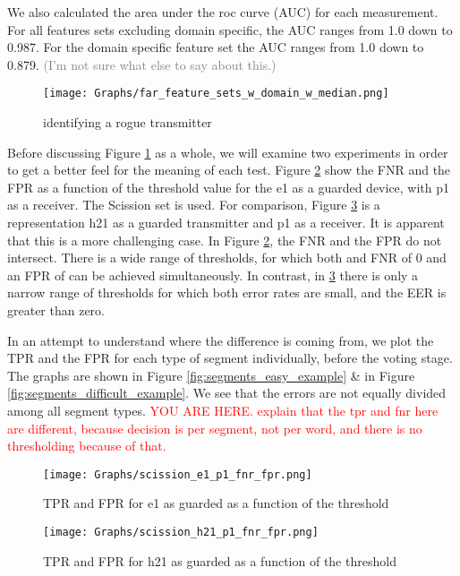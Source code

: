 \documentclass[conference]{IEEEtran}
\begin{document}
  We also calculated the area under the roc curve (AUC) for each measurement. For all features sets excluding domain specific, the AUC ranges from 1.0 down to 0.987. For the domain specific feature set the AUC ranges from 1.0 down to 0.879. \textcolor{gray}{(I'm not sure what else to say about this.)}
  
  \begin{figure}[t]
    \centering
    \texttt{[image: Graphs/far\_feature\_sets\_w\_domain\_w\_median.png]}
    \caption{identifying a rogue transmitter}
    \label{fig:rogue_transmitter_results}
  \end{figure}
  
  Before discussing Figure \ref{fig:rogue_transmitter_results} as a whole, we will examine two experiments in order to get a better feel for the meaning of each test. Figure \ref{fig:detection_easy_example} show the FNR and the FPR as a function of the threshold value for the e1 as a guarded device, with p1 as a receiver. The Scission set is used. For comparison, Figure \ref{fig:detection_difficult_example} is a representation h21 as a guarded transmitter and p1 as a receiver. It is apparent that this is a more challenging case. In Figure \ref{fig:detection_easy_example}, the FNR and the FPR do not intersect. There is a wide range of thresholds, for which both and FNR of 0 and an FPR of can be achieved simultaneously. In contrast, in \ref{fig:detection_difficult_example} there is only a narrow range of thresholds for which both error rates are small, and the EER is greater than zero.
  
  In an attempt to understand where the difference is coming from, we plot the TPR and the FPR for each type of segment individually, before the voting stage. The graphs are shown in Figure \ref{fig:segments_easy_example} \& in Figure \ref{fig:segments_difficult_example}. We see that the errors are not equally divided among all segment types.
  \textcolor{red}{YOU ARE HERE. explain that the tpr and fnr here are different, because decision is per segment, not per word, and there is no thresholding because of that.}

  \begin{figure}[t]
    \centering
    \texttt{[image: Graphs/scission\_e1\_p1\_fnr\_fpr.png]}
    \caption{TPR and FPR for e1 as guarded as a function of the threshold}
    \label{fig:detection_easy_example}
  \end{figure}
  
  \begin{figure}[t]
    \centering
    \texttt{[image: Graphs/scission\_h21\_p1\_fnr\_fpr.png]}
    \caption{TPR and FPR for h21 as guarded as a function of the threshold}
    \label{fig:detection_difficult_example}
  \end{figure}
  
\end{document}
